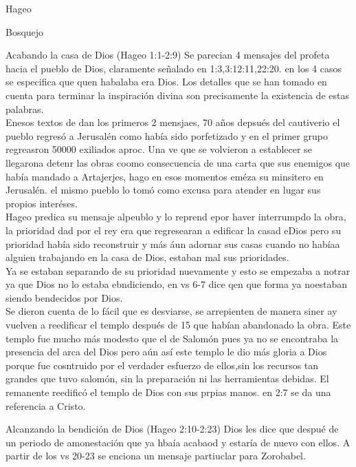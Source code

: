 \documentclass[12pt]{article}
\begin{document}
\begin{section}{Hageo}
\begin{enumerate}
	\end{enumerate}
	\begin{subsection}{Bosquejo}
		\begin{subsubsection}{Acabando la casa de Dios (Hageo 1:1-2:9)}
			Se parecian 4 mensajes del profeta hacia el pueblo de Dios, claramente señalado en 1:3,3:12:11,22:20. en los 4 casos se especifica que quen habalaba era Dios. Los detalles que se han tomado en cuenta para terminar la inspiración divina son precisamente la existencia de estas palabras.\\
			Enesos textos de dan los primeros 2 mensjaes, 70 años depsués del cautiverio el pueblo regresó a Jerusalén como había sido porfetizado y en el primer grupo regreasron 50000 exiliados aproc. Una ve que se volvieron a establecer se llegarona detenr las obras coomo consecuencia de una carta que sus enemigos que había mandado a Artajerjes, hago en esos momentos eméza su minsitero en Jerusalén. el mismo pueblo lo tomó como excusa para atender en lugar sus propios interéses.\\
			Hageo predica su mensaje alpeublo y lo reprend epor haver interrumpdo la obra, la prioridad dad por el rey era que regresearan a edificar la casad eDios pero su prioridad había sido reconstruir y más áun adornar sus casas cuando no habíaa alguien trabajando en la casa de Dios, estaban mal sus prioridades.\\
			Ya se estaban separando de su prioridad nuevamente y esto se empezaba a  notrar ya que Dios no lo estaba ebndiciendo, en vs 6-7 dice qen que forma ya noestaban siendo bendecidos por Dios.\\
			Se dieron cuenta de lo fácil que es desviarse, se arrepienten de manera siner ay vuelven a reedificar el templo después de 15 que habían abandonado la obra. Este templo fue mucho más modesto que el de Salomón pues ya no se encontraba la presencia del arca del Dios pero aún así este templo le dio más gloria a Dios porque fue cosntruido por el verdader esfuerzo de ellos,sin los recursos tan grandes que tuvo salomón, sin la preparación ni las herramientas debidas. El remanente reedificó el templo de Dios con sus prpias manos. en 2:7 se da una referencia a Cristo.
		\end{subsubsection}
		\begin{subsubsection}{Alcanzando la bendición de Dios (Hageo 2:10-2:23)}
			Dios les dice que despué de un periodo de amonestación que ya hbaía acabaod y estaría de nuevo con ellos. A  partir de los vs 20-23 se enciona un mensaje partiuclar para Zorobabel.
		\end{subsubsection}
	\end{subsection}
\end{section}
\end{document}
